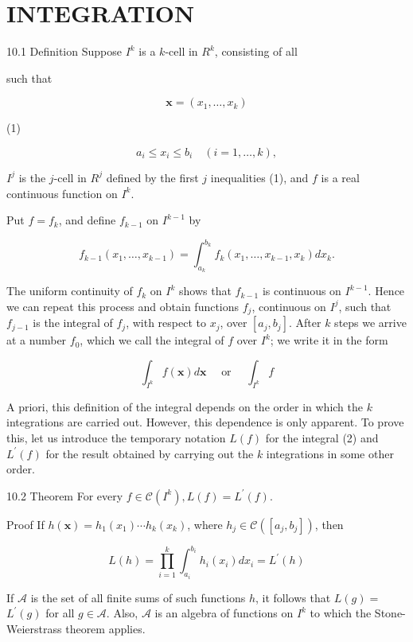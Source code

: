 \documentclass[10pt]{article}
\begin{document}
\section{INTEGRATION}
10.1 Definition Suppose $I^{k}$ is a $k$-cell in $R^{k}$, consisting of all

such that

$$
\mathbf{x}=\left(x_{1}, \ldots, x_{k}\right)
$$

(1)

$$
a_{i} \leq x_{i} \leq b_{i} \quad(i=1, \ldots, k),
$$

$I^{j}$ is the $j$-cell in $R^{j}$ defined by the first $j$ inequalities (1), and $f$ is a real continuous function on $I^{k}$.

Put $f=f_{k}$, and define $f_{k-1}$ on $I^{k-1}$ by

$$
f_{k-1}\left(x_{1}, \ldots, x_{k-1}\right)=\int_{a_{k}}^{b_{k}} f_{k}\left(x_{1}, \ldots, x_{k-1}, x_{k}\right) d x_{k} .
$$

The uniform continuity of $f_{k}$ on $I^{k}$ shows that $f_{k-1}$ is continuous on $I^{k-1}$. Hence we can repeat this process and obtain functions $f_{j}$, continuous on $I^{j}$, such that $f_{j-1}$ is the integral of $f_{j}$, with respect to $x_{j}$, over $\left[a_{j}, b_{j}\right]$. After $k$ steps we arrive at a number $f_{0}$, which we call the integral of $f$ over $I^{k}$; we write it in the form

$$
\int_{I^{k}} f(\mathbf{x}) d \mathbf{x} \quad \text { or } \quad \int_{I^{k}} f
$$

A priori, this definition of the integral depends on the order in which the $k$ integrations are carried out. However, this dependence is only apparent. To prove this, let us introduce the temporary notation $L(f)$ for the integral (2) and $L^{\prime}(f)$ for the result obtained by carrying out the $k$ integrations in some other order.

10.2 Theorem For every $f \in \mathscr{C}\left(I^{k}\right), L(f)=L^{\prime}(f)$.

Proof If $h(\mathbf{x})=h_{1}\left(x_{1}\right) \cdots h_{k}\left(x_{k}\right)$, where $h_{j} \in \mathscr{C}\left(\left[a_{j}, b_{j}\right]\right)$, then

$$
L(h)=\prod_{i=1}^{k} \int_{a_{i}}^{b_{i}} h_{i}\left(x_{i}\right) d x_{i}=L^{\prime}(h)
$$

If $\mathscr{A}$ is the set of all finite sums of such functions $h$, it follows that $L(g)=$ $L^{\prime}(g)$ for all $g \in \mathscr{A}$. Also, $\mathscr{A}$ is an algebra of functions on $I^{k}$ to which the Stone-Weierstrass theorem applies.
\end{document}
